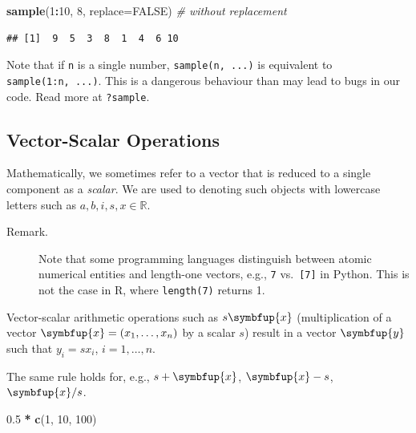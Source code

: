 \documentclass[10pt,b5paper,krantz1]{krantz}
\newenvironment{Shaded}{\begin{snugshade}}{\end{snugshade}}
\newcommand{\CommentTok}[1]{\textcolor[rgb]{0.37,0.37,0.37}{\textit{#1}}}
\newcommand{\DataTypeTok}[1]{\textcolor[rgb]{0.27,0.27,0.27}{#1}}
\newcommand{\DecValTok}[1]{\textcolor[rgb]{0.06,0.06,0.06}{#1}}
\newcommand{\FloatTok}[1]{\textcolor[rgb]{0.06,0.06,0.06}{#1}}
\newcommand{\KeywordTok}[1]{\textcolor[rgb]{0.27,0.27,0.27}{\textbf{#1}}}
\newcommand{\NormalTok}[1]{#1}
\newcommand{\OperatorTok}[1]{\textcolor[rgb]{0.43,0.43,0.43}{\textbf{#1}}}
\newcommand{\OtherTok}[1]{\textcolor[rgb]{0.37,0.37,0.37}{#1}}
\newcommand{\StringTok}[1]{\textcolor[rgb]{0.5,0.5,0.5}{#1}}
\renewcommand{\boldsymbol}[1]{\symbfup{#1}}
\begin{document}
\begin{Shaded}
\begin{Highlighting}[]
\KeywordTok{sample}\NormalTok{(}\DecValTok{1}\OperatorTok{:}\DecValTok{10}\NormalTok{, }\DecValTok{8}\NormalTok{, }\DataTypeTok{replace=}\OtherTok{FALSE}\NormalTok{) }\CommentTok{# without replacement}
\end{Highlighting}
\end{Shaded}

\begin{verbatim}
## [1]  9  5  3  8  1  4  6 10
\end{verbatim}

Note that if \texttt{n} is a single number,
\texttt{sample(n,\ ...)} is equivalent to \texttt{sample(1:n,\ ...)}.
This is a dangerous behaviour than may lead to bugs in our code.
Read more at \texttt{?sample}.

\hypertarget{vector-scalar-operations}{%
\subsection{Vector-Scalar Operations}\label{vector-scalar-operations}}

Mathematically, we sometimes refer to a vector that is reduced to a single component
as a \emph{scalar}. We are used to denoting such objects with lowercase letters
such as \(a, b, i, s, x\in\mathbb{R}\).

\begin{description}
\item[Remark.]
Note that some programming languages distinguish between
atomic numerical entities and length-one vectors, e.g., \texttt{7} vs.~\texttt{{[}7{]}} in Python.
This is not the case in R, where \texttt{length(7)} returns 1.
\end{description}

Vector-scalar arithmetic operations
such as \(s\boldsymbol{x}\) (multiplication of a vector \(\boldsymbol{x}=(x_1,\dots, x_n)\)
by a scalar \(s\)) result in a vector \(\boldsymbol{y}\) such that \(y_i=s x_i\), \(i=1,\dots,n\).

The same rule holds for, e.g., \(s+\boldsymbol{x}\), \(\boldsymbol{x}-s\), \(\boldsymbol{x}/s\).

\begin{Shaded}
\begin{Highlighting}[]
\FloatTok{0.5} \OperatorTok{*}\StringTok{ }\KeywordTok{c}\NormalTok{(}\DecValTok{1}\NormalTok{, }\DecValTok{10}\NormalTok{, }\DecValTok{100}\NormalTok{)}
\end{Highlighting}
\end{Shaded}
\end{document}
